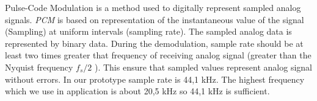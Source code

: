 \documentclass[11pt,titlepage]{article}
\theoremstyle{plain}
\begin{document}
Pulse-Code Modulation is a method used to digitally represent sampled analog signals. \textit{PCM} is based on representation of the instantaneous value of the signal (Sampling) at uniform intervals (sampling rate). The sampled analog data is represented by binary data. During the demodulation, sample rate should be at least two times greater that frequency of receiving analog signal (greater than the Nyquist frequency $f_s / 2$ ). This ensure that sampled values represent analog signal without errors. In our prototype sample rate is 44,1 kHz. The highest frequency which we use in application is about 20,5 kHz so 44,1 kHz is sufficient. 

\end{document}
